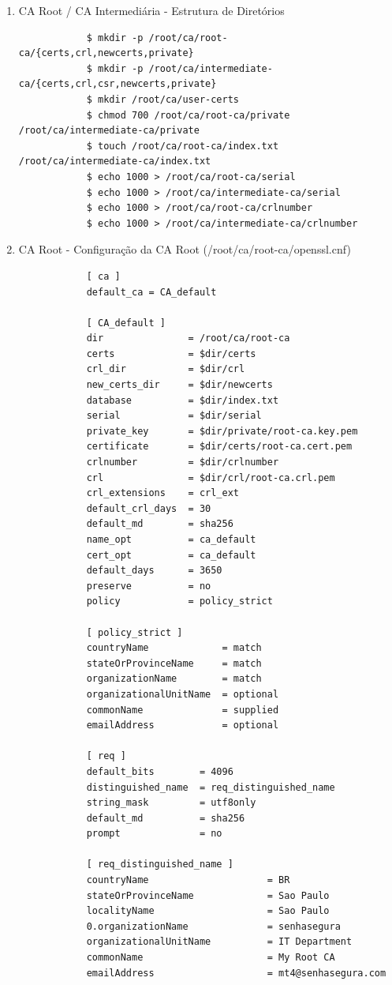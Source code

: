 \documentclass{article}
\begin{document}
\begin{enumerate}
	\item CA Root / CA Intermediária - Estrutura de Diretórios
	\begin{tcolorbox}[width=\textwidth]
	{\footnotesize
		\begin{verbatim}
			$ mkdir -p /root/ca/root-ca/{certs,crl,newcerts,private}
			$ mkdir -p /root/ca/intermediate-ca/{certs,crl,csr,newcerts,private}
			$ mkdir /root/ca/user-certs
			$ chmod 700 /root/ca/root-ca/private /root/ca/intermediate-ca/private
			$ touch /root/ca/root-ca/index.txt /root/ca/intermediate-ca/index.txt
			$ echo 1000 > /root/ca/root-ca/serial
			$ echo 1000 > /root/ca/intermediate-ca/serial
			$ echo 1000 > /root/ca/root-ca/crlnumber
			$ echo 1000 > /root/ca/intermediate-ca/crlnumber
		\end{verbatim}
	}
	\end{tcolorbox}

	\item CA Root - Configuração da CA Root (/root/ca/root-ca/openssl.cnf)
	\begin{tcolorbox}[width=\textwidth, enhanced, breakable]
	{\footnotesize
		\begin{verbatim}
			[ ca ]
			default_ca = CA_default
			
			[ CA_default ]
			dir               = /root/ca/root-ca
			certs             = $dir/certs
			crl_dir           = $dir/crl
			new_certs_dir     = $dir/newcerts
			database          = $dir/index.txt
			serial            = $dir/serial
			private_key       = $dir/private/root-ca.key.pem
			certificate       = $dir/certs/root-ca.cert.pem
			crlnumber         = $dir/crlnumber
			crl               = $dir/crl/root-ca.crl.pem
			crl_extensions    = crl_ext
			default_crl_days  = 30
			default_md        = sha256
			name_opt          = ca_default
			cert_opt          = ca_default
			default_days      = 3650
			preserve          = no
			policy            = policy_strict
			
			[ policy_strict ]
			countryName             = match
			stateOrProvinceName     = match
			organizationName        = match
			organizationalUnitName  = optional
			commonName              = supplied
			emailAddress            = optional
			
			[ req ]
			default_bits        = 4096
			distinguished_name  = req_distinguished_name
			string_mask         = utf8only
			default_md          = sha256
			prompt              = no
			
			[ req_distinguished_name ]
			countryName                     = BR
			stateOrProvinceName             = Sao Paulo
			localityName                    = Sao Paulo
			0.organizationName              = senhasegura
			organizationalUnitName          = IT Department
			commonName                      = My Root CA
			emailAddress                    = mt4@senhasegura.com
			

\end{verbatim}}
\end{tcolorbox}
\end{enumerate}
\end{document}
